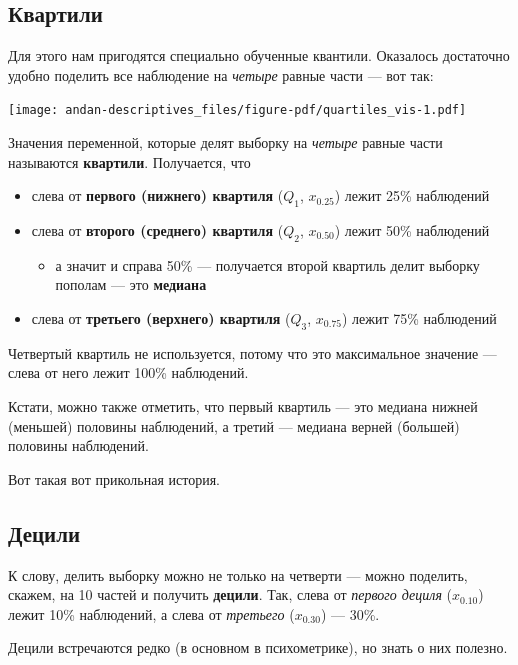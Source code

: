 \documentclass[
  letterpaper,
]{scrbook}
\providecommand{\tightlist}{%
  \setlength{\itemsep}{0pt}\setlength{\parskip}{0pt}}\usepackage{longtable,booktabs,array}
\theoremstyle{definition}
\theoremstyle{remark}
\begin{document}
\subsection{Квартили}\label{quartiles}

Для этого нам пригодятся специально обученные квантили. Оказалось
достаточно удобно поделить все наблюдение на \emph{четыре} равные части
--- вот так:

\texttt{[image: andan-descriptives\_files/figure-pdf/quartiles\_vis-1.pdf]}

Значения переменной, которые делят выборку на \emph{четыре} равные части
называются \textbf{квартили}. Получается, что

\begin{itemize}
\tightlist
\item
  слева от \textbf{первого (нижнего) квартиля} (\(Q_1\), \(x_{0.25}\))
  лежит 25\% наблюдений
\item
  слева от \textbf{второго (среднего) квартиля} (\(Q_2\), \(x_{0.50}\))
  лежит 50\% наблюдений

  \begin{itemize}
  \tightlist
  \item
    а значит и справа 50\% --- получается второй квартиль делит выборку
    пополам --- это \textbf{медиана}
  \end{itemize}
\item
  слева от \textbf{третьего (верхнего) квартиля} (\(Q_3\), \(x_{0.75}\))
  лежит 75\% наблюдений
\end{itemize}

Четвертый квартиль не используется, потому что это максимальное значение
--- слева от него лежит 100\% наблюдений.

Кстати, можно также отметить, что первый квартиль --- это медиана нижней
(меньшей) половины наблюдений, а третий --- медиана верней (большей)
половины наблюдений.

Вот такая вот прикольная история.

\subsection{Децили}\label{deciles}

К слову, делить выборку можно не только на четверти --- можно поделить,
скажем, на 10 частей и получить \textbf{децили}. Так, слева от
\emph{первого дециля} (\(x_{0.10}\)) лежит 10\% наблюдений, а слева от
\emph{третьего} (\(x_{0.30}\)) --- 30\%.

Децили встречаются редко (в основном в психометрике), но знать о них
полезно.
\end{document}
